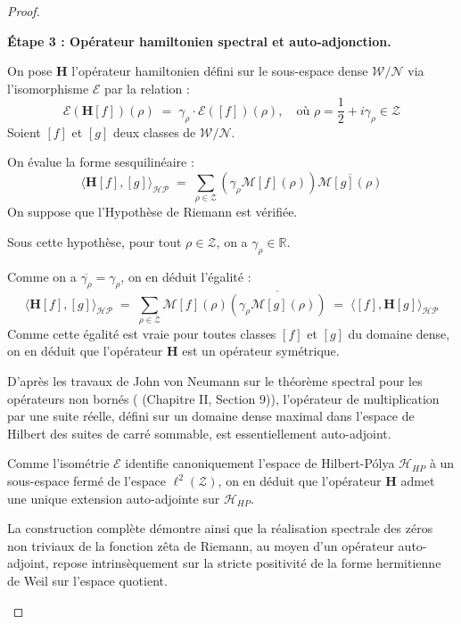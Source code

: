 \documentclass[Riemann_Hypothesis.tex]{subfiles}
\begin{document}
\begin{proof}
    \begin{part_proof}
        \textbf{Étape 3 : Opérateur hamiltonien spectral et auto-adjonction.} \par
        On pose $\mathbf{H}$ l'opérateur hamiltonien défini sur le sous-espace dense $\mathcal{W} / \mathcal{N}$ via l'isomorphisme $\mathcal{E}$ par la relation :
        \begin{equation*}
            \mathcal{E}\left(\mathbf{H} [f]\right)(\rho) \;=\; \gamma_\rho \cdot \mathcal{E}([f])(\rho), \quad \text{où } \rho = \frac{1}{2} + i\gamma_\rho \in \mathcal{Z}
        \end{equation*}
        Soient $[f]$ et $[g]$ deux classes de $\mathcal{W} / \mathcal{N}$. \par
        On évalue la forme sesquilinéaire :
        \begin{equation*}
            \langle \mathbf{H} [f], [g] \rangle_{\mathcal{HP}} \;=\; \sum_{\rho \in \mathcal{Z}} \left( \gamma_\rho \mathcal{M}[f](\rho) \right) \overline{\mathcal{M}[g](\rho)}
        \end{equation*}
        On suppose que l'Hypothèse de Riemann est vérifiée. \par
        Sous cette hypothèse, pour tout $\rho \in \mathcal{Z}$, on a $\gamma_\rho \in \mathbb{R}$. \par
        Comme on a $\overline{\gamma_\rho} = \gamma_\rho$, on en déduit l'égalité :
        \begin{equation*}
            \langle \mathbf{H} [f], [g] \rangle_{\mathcal{HP}} \;=\; \sum_{\rho \in \mathcal{Z}} \mathcal{M}[f](\rho) \overline{\left( \gamma_\rho \mathcal{M}[g](\rho) \right)} \;=\; \langle [f], \mathbf{H} [g] \rangle_{\mathcal{HP}}
        \end{equation*}
        Comme cette égalité est vraie pour toutes classes $[f]$ et $[g]$ du domaine dense, on en déduit que l'opérateur $\mathbf{H}$ est un opérateur symétrique. \par
        D'après les travaux de John von Neumann sur le théorème spectral pour les 
        opérateurs non bornés 
        (\cite{vonneumann_quantum} (Chapitre II, Section 9)), 
        l'opérateur de multiplication par une suite réelle, défini sur un domaine 
        dense maximal dans l'espace de Hilbert des suites de carré sommable, est 
        essentiellement auto-adjoint. \par
        Comme l'isométrie $\mathcal{E}$ identifie canoniquement l'espace de 
        Hilbert-Pólya $\mathcal{H}_{HP}$ à un sous-espace fermé de l'espace 
        $\ell^2(\mathcal{Z})$, on en déduit que l'opérateur $\mathbf{H}$ 
        admet une unique extension auto-adjointe sur $\mathcal{H}_{HP}$. \par
        La construction complète démontre ainsi que la réalisation spectrale des zéros 
        non triviaux de la fonction zêta de Riemann, au moyen d'un opérateur 
        auto-adjoint, repose intrinsèquement sur la stricte positivité de la 
        forme hermitienne de Weil sur l'espace quotient.
    \end{part_proof}

\end{proof}
\end{document}
